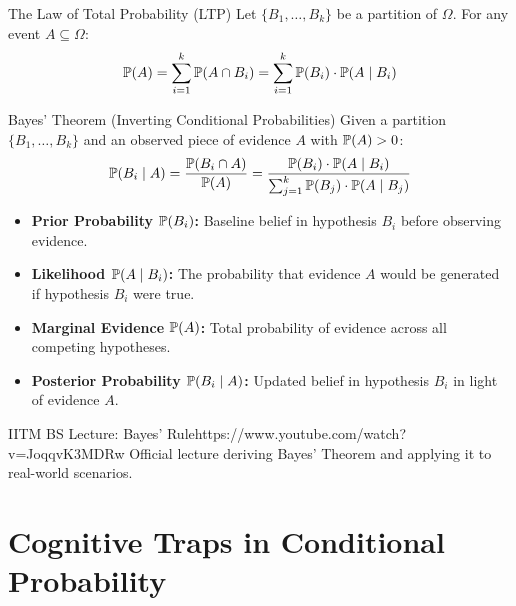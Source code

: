 \begin{theorembox}{The Law of Total Probability (LTP)}
Let $\{B_1, \dots, B_k\}$ be a partition of $\Omega$. For any event $A \subseteq \Omega$:
$$\P(A) = \sum_{i=1}^k \P(A \cap B_i) = \sum_{i=1}^k \P(B_i) \cdot \P(A \mid B_i)$$
\end{theorembox}

\begin{theorembox}{Bayes' Theorem (Inverting Conditional Probabilities)}
Given a partition $\{B_1, \dots, B_k\}$ and an observed piece of evidence $A$ with $\P(A) > 0$:
$$\P(B_i \mid A) = \frac{\P(B_i \cap A)}{\P(A)} = \frac{\P(B_i) \cdot \P(A \mid B_i)}{\sum_{j=1}^k \P(B_j) \cdot \P(A \mid B_j)}$$
\begin{itemize}
    \item \textbf{Prior Probability $\P(B_i)$:} Baseline belief in hypothesis $B_i$ before observing evidence.
    \item \textbf{Likelihood $\P(A \mid B_i)$:} The probability that evidence $A$ would be generated if hypothesis $B_i$ were true.
    \item \textbf{Marginal Evidence $\P(A)$:} Total probability of evidence across all competing hypotheses.
    \item \textbf{Posterior Probability $\P(B_i \mid A)$:} Updated belief in hypothesis $B_i$ in light of evidence $A$.
\end{itemize}
\end{theorembox}

\begin{videocard}{IITM BS Lecture: Bayes' Rule}{https://www.youtube.com/watch?v=JoqqvK3MDRw}
Official lecture deriving Bayes' Theorem and applying it to real-world scenarios.
\end{videocard}

\section{Cognitive Traps in Conditional Probability}

